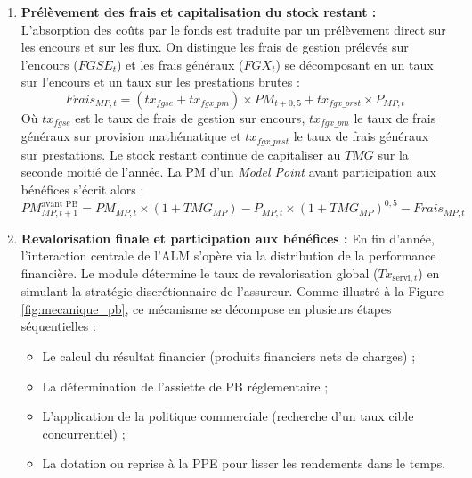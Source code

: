 \begin{enumerate}
    \item \textbf{Prélèvement des frais et capitalisation du stock restant :}
    L'absorption des coûts par le fonds est traduite par un prélèvement direct sur les encours et sur les flux. On distingue les frais de gestion prélevés sur l'encours ($FGSE_t$) et les frais généraux ($FGX_t$) se décomposant en un taux sur l'encours et un taux sur les prestations brutes :
    \begin{equation}
        Frais_{MP,t} = (tx_{fgse} + tx_{fgx\_pm}) \times PM_{t+0{,}5} + tx_{fgx\_prst} \times P_{MP,t}
    \end{equation}
    Où $tx_{fgse}$ est le taux de frais de gestion sur encours, $tx_{fgx\_pm}$ le taux de frais généraux sur provision mathématique et $tx_{fgx\_prst}$ le taux de frais généraux sur prestations. Le stock restant continue de capitaliser au $TMG$ sur la seconde moitié de l'année. La PM d'un \textit{Model Point} avant participation aux bénéfices s'écrit alors : 
    \begin{equation}
        PM_{MP,t+1}^{\text{avant PB}} = PM_{MP,t} \times (1 + TMG_{MP}) - P_{MP,t} \times (1 + TMG_{MP})^{0{,}5} - Frais_{MP,t}
    \end{equation}
    \item \textbf{Revalorisation finale et participation aux bénéfices :}
    En fin d'année, l'interaction centrale de l'ALM s'opère via la distribution de la performance financière. Le module détermine le taux de revalorisation global ($Tx_{\text{servi}, t}$) en simulant la stratégie discrétionnaire de l'assureur. Comme illustré à la Figure \ref{fig:mecanique_pb}, ce mécanisme se décompose en plusieurs étapes séquentielles :
    \begin{itemize}
        \item Le calcul du résultat financier (produits financiers nets de charges) ;
        \item La détermination de l'assiette de PB réglementaire ;
        \item L'application de la politique commerciale (recherche d'un taux cible concurrentiel) ;
        \item La dotation ou reprise à la PPE pour lisser les rendements dans le temps.
    \end{itemize}


\end{enumerate}
